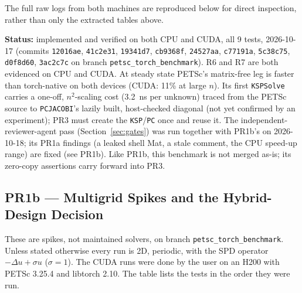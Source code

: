 \documentclass[11pt]{article}
\newcommand{\pr}[2]{\subsection{PR#1 --- #2}}
\newcommand{\status}[1]{\textcolor{marlinteal}{\textbf{Status:}} #1}
\begin{document}
The full raw logs from both machines are reproduced below for direct
inspection, rather than only the extracted tables above.







\status{implemented and verified on both CPU and CUDA, all 9 tests,
2026-10-17 (commits \texttt{12016ae}, \texttt{41c2e31}, \texttt{19341d7},
\texttt{cb9368f}, \texttt{24527aa}, \texttt{c77191a}, \texttt{5c38c75},
\texttt{d0f8d60}, \texttt{3ac2c7c} on branch \texttt{petsc\_torch\_benchmark}).
R6 and R7 are both evidenced on CPU and CUDA. At steady state PETSc's
matrix-free leg is faster than torch-native on both devices (CUDA: 11\% at
large $n$). Its first \texttt{KSPSolve} carries a one-off, $n^{2}$-scaling
cost (3.2~ns per unknown) traced from the PETSc source to
\texttt{PCJACOBI}'s lazily built, host-checked diagonal (not yet confirmed by
an experiment); PR3 must create the \texttt{KSP}/\texttt{PC} once and reuse it.
The independent-reviewer-agent pass (Section~\ref{sec:gates}) was run
together with PR1b's on 2026-10-18; its PR1a findings (a leaked shell Mat, a
stale comment, the CPU speed-up range) are fixed (see PR1b). Like PR1b, this
benchmark is not merged as-is; its zero-copy assertions carry forward into
PR3.}

\pr{1b}{Multigrid Spikes and the Hybrid-Design Decision}
\label{sec:pr1b}
These are spikes, not maintained solvers, on branch \texttt{petsc\_torch\_benchmark}.
Unless stated otherwise every run is 2D, periodic, with the SPD operator
$-\Delta u + \sigma u$ ($\sigma = 1$). The CUDA runs were done by the user on an
H200 with PETSc 3.25.4 and libtorch 2.10. The table lists the tests in the
order they were run.
\end{document}
